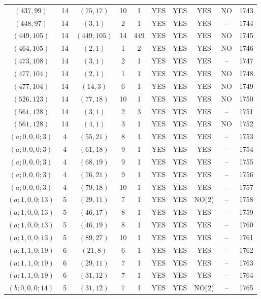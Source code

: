 \begin{longtable}{|c|c|c|c|c|c|c|c|c|c|}
$(437, 99)$ & 14 & $(75, 17)$ & 10 & 1 & YES & YES & YES & NO & 1743\\
$(448, 97)$ & 14 & $(3, 1)$ & 2 & 1 & YES & YES & YES & -- & 1744\\
$(449, 105)$ & 14 & $(449, 105)$ & 14 & 449 & YES & YES & YES & NO & 1745\\
$(464, 105)$ & 14 & $(2, 1)$ & 1 & 2 & YES & YES & YES & NO & 1746\\
$(473, 108)$ & 14 & $(3, 1)$ & 2 & 1 & YES & YES & YES & -- & 1747\\
$(477, 104)$ & 14 & $(2, 1)$ & 1 & 1 & YES & YES & YES & NO & 1748\\
$(477, 104)$ & 14 & $(14, 3)$ & 6 & 1 & YES & YES & YES & NO & 1749\\
$(526, 123)$ & 14 & $(77, 18)$ & 10 & 1 & YES & YES & YES & NO & 1750\\
$(561, 128)$ & 14 & $(3, 1)$ & 2 & 3 & YES & YES & YES & -- & 1751\\
$(561, 128)$ & 14 & $(4, 1)$ & 3 & 1 & YES & YES & YES & NO & 1752\\
$(a; 0, 0, 0; 3)$ & 4 & $(55, 21)$ & 8 & 1 & YES & YES & YES & -- & 1753\\
$(a; 0, 0, 0; 3)$ & 4 & $(61, 18)$ & 9 & 1 & YES & YES & YES & -- & 1754\\
$(a; 0, 0, 0; 3)$ & 4 & $(68, 19)$ & 9 & 1 & YES & YES & YES & -- & 1755\\
$(a; 0, 0, 0; 3)$ & 4 & $(76, 21)$ & 9 & 1 & YES & YES & YES & -- & 1756\\
$(a; 0, 0, 0; 3)$ & 4 & $(79, 18)$ & 10 & 1 & YES & YES & YES & -- & 1757\\
$(a; 1, 0, 0; 13)$ & 5 & $(29, 11)$ & 7 & 1 & YES & YES & NO(2) & -- & 1758\\
$(a; 1, 0, 0; 13)$ & 5 & $(46, 17)$ & 8 & 1 & YES & YES & YES & -- & 1759\\
$(a; 1, 0, 0; 13)$ & 5 & $(46, 19)$ & 8 & 1 & YES & YES & YES & -- & 1760\\
$(a; 1, 0, 0; 13)$ & 5 & $(89, 27)$ & 10 & 1 & YES & YES & YES & -- & 1761\\
$(a; 1, 1, 0; 19)$ & 6 & $(21, 8)$ & 6 & 1 & YES & YES & YES & -- & 1762\\
$(a; 1, 1, 0; 19)$ & 6 & $(29, 11)$ & 7 & 1 & YES & YES & YES & -- & 1763\\
$(a; 1, 1, 0; 19)$ & 6 & $(31, 12)$ & 7 & 1 & YES & YES & YES & -- & 1764\\
$(b; 0, 0, 0; 14)$ & 5 & $(31, 12)$ & 7 & 1 & YES & YES & NO(2) & -- & 1765\\

\end{longtable}
